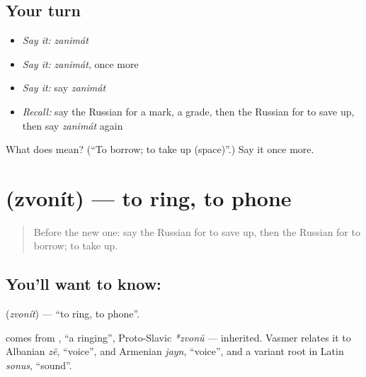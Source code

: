 \subsection*{Your turn}
\begin{itemize}
\raggedright
  \item \emph{Say it:} \emph{zanimát}
  \item \emph{Say it:} \emph{zanimát}, once more
  \item \emph{Say it:} say \emph{zanimát}
  \item \emph{Recall:} say the Russian for a mark, a grade, then the Russian for to save up, then say \emph{zanimát} again
\end{itemize}

\begin{tcolorbox}[breakable,colback=teal!4,colframe=teal!35!black,title={Before you move on}]
What does  mean? (\textquotedblleft{}To borrow; to take up (space)\textquotedblright{}.) Say it once more.
\end{tcolorbox}
\section[\texorpdfstring{\ru{звонить} (zvonít)}{звонить (zvonít)}]{ (zvonít) — to ring, to phone}

\label{lesson:RU-C232-zvonit}



\begin{quote}
Before the new one: say the Russian for to save up, then the Russian for to borrow; to take up.
\end{quote}

\subsection*{You'll want to know: }
\textbf{} (\emph{zvonít}) — \textquotedblleft{}to ring, to phone\textquotedblright{}.

\begin{cousinweb}
\textbf{} comes from \emph{}, \textquotedblleft{}a ringing\textquotedblright{}, Proto-Slavic \emph{*zvonŭ} — inherited. Vasmer relates it to Albanian \emph{zë}, \textquotedblleft{}voice\textquotedblright{}, and Armenian \emph{jayn}, \textquotedblleft{}voice\textquotedblright{}, and a variant root in Latin \emph{sonus}, \textquotedblleft{}sound\textquotedblright{}.
\end{cousinweb}

